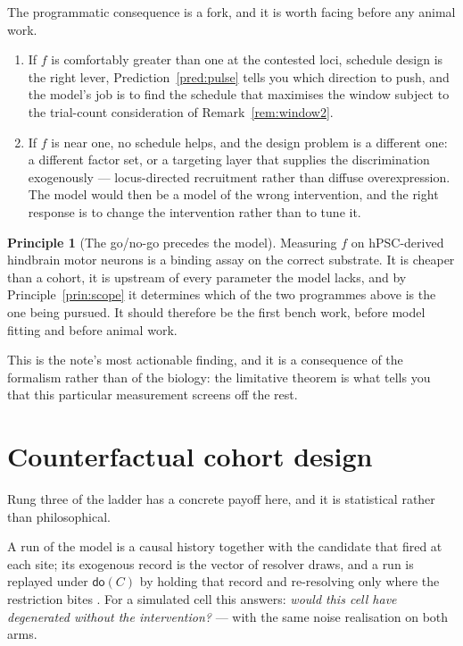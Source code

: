 \documentclass[11pt,a4paper]{article}
\theoremstyle{plain}
\theoremstyle{definition}
\newtheorem{principle}[theorem]{Principle}
\theoremstyle{remark}
\newcommand{\dok}{\textsf{do}}
\begin{document}
The programmatic consequence is a fork, and it is worth facing before any
animal work.

\begin{enumerate}[leftmargin=1.6em,itemsep=3pt]
\item If $f$ is comfortably greater than one at the contested loci, schedule
design is the right lever, Prediction~\ref{pred:pulse} tells you which
direction to push, and the model's job is to find the schedule that maximises
the window subject to the trial-count consideration of
Remark~\ref{rem:window2}.
\item If $f$ is near one, no schedule helps, and the design problem is a
different one: a different factor set, or a targeting layer that supplies the
discrimination exogenously --- locus-directed recruitment rather than diffuse
overexpression. The model would then be a model of the wrong intervention, and
the right response is to change the intervention rather than to tune it.
\end{enumerate}

\begin{principle}[The go/no-go precedes the model]\label{prin:gonogo}
Measuring $f$ on hPSC-derived hindbrain motor neurons \cite{TwoOrgans} is a
binding assay on the correct substrate. It is cheaper than a cohort, it is
upstream of every parameter the model lacks, and by
Principle~\ref{prin:scope} it determines which of the two programmes above is
the one being pursued. It should therefore be the first bench work, before
model fitting and before animal work.
\end{principle}

This is the note's most actionable finding, and it is a consequence of the
formalism rather than of the biology: the limitative theorem is what tells you
that this particular measurement screens off the rest.

\section{Counterfactual cohort design}\label{sec:cohort}

Rung three of the ladder has a concrete payoff here, and it is statistical
rather than philosophical.

A run of the model is a causal history together with the candidate that fired
at each site; its exogenous record is the vector of resolver draws, and a run
is replayed under $\dok(C)$ by holding that record and re-resolving only where
the restriction bites \cite[Def.~3.12, Thm.~3.13]{Interventions}. For a
simulated cell this answers: \emph{would this cell have degenerated without
the intervention?} --- with the same noise realisation on both arms.
\end{document}
